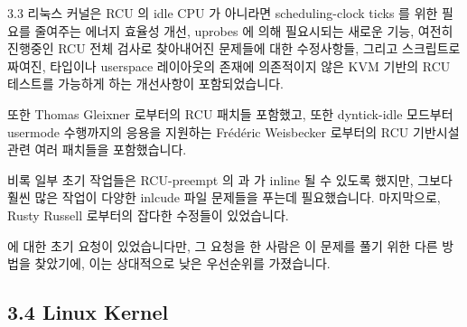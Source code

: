 3.3 리눅스 커널은 RCU 의 idle CPU 가 아니라면 scheduling-clock ticks 를 위한
필요를 줄여주는 에너지 효율성 개선, uprobes 에 의해 필요시되는 새로운
 기능, 여전히 진행중인 RCU 전체 검사로 찾아내어진
문제들에 대한 수정사항들, 그리고 스크립트로 짜여진, 타입이나 userspace
레이아웃의 존재에 의존적이지 않은 KVM 기반의 RCU 테스트를 가능하게 하는
 개선사항이 포함되었습니다.

또한 Thomas Gleixner 로부터의  RCU 패치들 포함했고, 또한 dyntick-idle
모드부터 usermode 수행까지의 응용을 지원하는 Fr\'ed\'eric Weisbecker 로부터의
RCU 기반시설 관련 여러 패치들을 포함했습니다.

비록 일부 초기 작업들은 RCU-preempt 의  과
 가 inline 될 수 있도록 했지만, 그보다 훨씬 많은 작업이
다양한 inlcude 파일 문제들을 푸는데 필요했습니다.
마지막으로, Rusty Russell 로부터의 잡다한 수정들이 있었습니다.

 에 대한 초기 요청이 있었습니다만, 그 요청을 한
사람은 이 문제를 풀기 위한 다른 방법을 찾았기에, 이는 상대적으로 낮은
우선순위를 가졌습니다.

\subsection{3.4 Linux Kernel}

